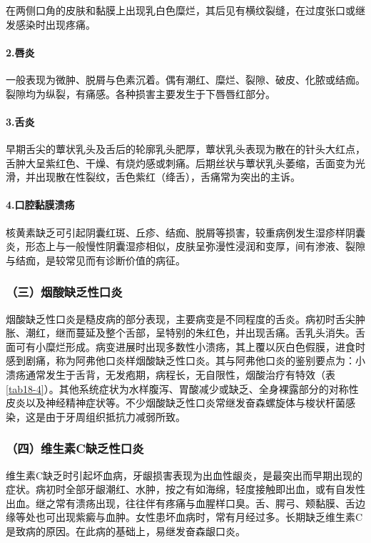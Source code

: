 在两侧口角的皮肤和黏膜上出现乳白色糜烂，其后见有横纹裂缝，在过度张口或继发感染时出现疼痛。

\paragraph{2.唇炎}

一般表现为微肿、脱屑与色素沉着。偶有潮红、糜烂、裂隙、破皮、化脓或结痂。裂隙均为纵裂，有痛感。各种损害主要发生于下唇唇红部分。

\paragraph{3.舌炎}

早期舌尖的蕈状乳头及舌后的轮廓乳头肥厚，蕈状乳头表现为散在的针头大红点，舌肿大呈紫红色、干燥、有烧灼感或刺痛。后期丝状与蕈状乳头萎缩，舌面变为光滑，并出现散在性裂纹，舌色紫红（绛舌），舌痛常为突出的主诉。

\paragraph{4.口腔黏膜溃疡}

核黄素缺乏可引起阴囊红斑、丘疹、结痂、脱屑等损害，较重病例发生湿疹样阴囊炎，形态上与一般慢性阴囊湿疹相似，皮肤呈弥漫性浸润和变厚，间有渗液、裂隙与结痂，是较常见而有诊断价值的病征。

\subsubsection{（三）烟酸缺乏性口炎}

烟酸缺乏性口炎是糙皮病的部分表现，主要病变是不同程度的舌炎。病初时舌尖肿胀、潮红，继而蔓延及整个舌部，呈特别的朱红色，并出现舌痛。舌乳头消失。舌面可有小糜烂形成。病变进展时出现多数性小溃疡，其上覆以灰白色假膜，进食时感到剧痛，称为阿弗他口炎样烟酸缺乏性口炎。其与阿弗他口炎的鉴别要点为：小溃疡通常发生于舌背，无发疱期，病程长，无自限性，烟酸治疗有特效（表\ref{tab18-4}）。其他系统症状为水样腹泻、胃酸减少或缺乏、全身裸露部分的对称性皮炎以及神经精神症状等。不少烟酸缺乏性口炎常继发奋森螺旋体与梭状杆菌感染，这是由于牙周组织抵抗力减弱所致。

\subsubsection{（四）维生素C缺乏性口炎}

维生素C缺乏时引起坏血病，牙龈损害表现为出血性龈炎，是最突出而早期出现的症状。病初时全部牙龈潮红、水肿，按之有如海绵，轻度接触即出血，或有自发性出血。继之常有溃疡出现，往往伴有疼痛与血腥样口臭。舌、腭弓、颊黏膜、舌边缘等处也可出现紫癜与血肿。女性患坏血病时，常有月经过多。长期缺乏维生素C是致病的原因。在此病的基础上，易继发奋森龈口炎。

